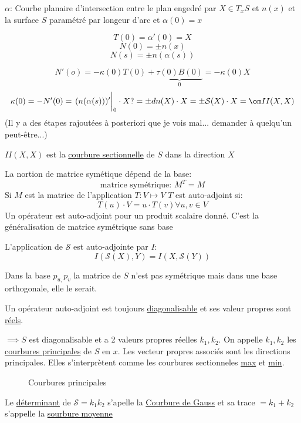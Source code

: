 $\alpha$: Courbe planaire d'intersection entre le plan engedré par $X \in T_{x} S$ et $n(x)$ et la surface $S$ paramétré par longeur d'arc et $\alpha(0) =x$     

$$T(0) = \alpha'(0)= X$$ 
$$N(0) = \pm n(x)$$ 
$$N(s) = \pm n(\alpha(s))$$ 

$$N'(o) = -\kappa(0) T(0) + \underbrace{\tau(0)B(0)}_0 = -\kappa(0) X$$ 
$$\kappa(0) = -N'(0) = \eval{(n(\alpha(s)))'}_{0} \cdot X ? =\pm dn(X) \cdot X = \pm \mathcal{S}(X) \cdot X = \om II(X,X)$$ 
(Il y a des étapes rajoutées à posteriori que je vois mal... demander à quelqu'un peut-être...)

$II(X,X)$ est la \underline{courbure sectionnelle} de $S$ dans la direction $X$     


\begin{tcolorbox}[title=Parenthèse d'algèbre linéaire]
	La nortion de matrice symétique dépend de la base:
	$$\text{matrice symétrique: } M^T = M$$ 
	Si $M$ est la matrice de l'application $T: V\mapsto V$ 
	$T$ est auto-adjoint si: 
	$$T(u)\cdot V = u\cdot T(v) \forall u,v \in V$$ 
	Un opérateur est auto-adjoint pour un produit scalaire donné. C'est la généralisation de matrice symétrique sans base
\end{tcolorbox}

L'application de $\mathcal{S} $ est auto-adjointe par $I$:
$$I(\mathcal{S}(X),Y) = I(X, \mathcal{S}(Y))$$ 

Dans la base $p_{u,} p_v$ la matrice de $S$ n'est pas symétrique mais dans une base orthogonale, elle le serait. 

Un opérateur auto-adjoint est toujours \underline{diagonalisable} et ses valeur propres sont \underline{réels}.

$\implies S$ est diagonalisable et a 2 valeurs propres réelles $k_{1}, k_{2} $. On appelle $k_{1}, k_{2}$ les \underline{courbures principales} de $S$ en $x$. Les vecteur propres associés sont les directions principales. Elles s'interprètent comme les courbures sectionneles \underline{max} et \underline{min}.

\begin{figure}[ht]
    \centering
    \caption{Courbures principales}
    \label{fig:courbures-principales}
\end{figure}

Le \underline{déterminant} de $\mathcal{S} =k_{1} k_{2} $ s'apelle la \underline{Courbure de Gauss} et sa trace $= k_1+k_2$ s'appelle la \underline{sourbure moyenne}      


